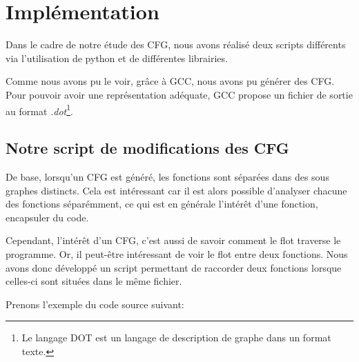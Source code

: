 \section{Implémentation}
Dans le cadre de notre étude des CFG, nous avons réalisé deux scripts différents via l'utilisation de python et de différentes librairies.

Comme nous avons pu le voir, grâce à GCC, nous avons pu générer des CFG. Pour pouvoir avoir une représentation adéquate, GCC propose un fichier de sortie au format \textit{.dot}\footnote{Le langage DOT est un langage de description de graphe dans un format texte.}.

\subsection{Notre script de modifications des CFG}
De base, lorsqu'un CFG est généré, les fonctions sont séparées dans des sous graphes distincts. Cela est intéressant car il est alors possible d'analyser chacune des fonctions séparémment, ce qui est en générale l'intérêt d'une fonction, encapsuler du code.

Cependant, l'intérêt d'un CFG, c'est aussi de savoir comment le flot traverse le programme. Or, il peut-être intéressant de voir le flot entre deux fonctions. Nous avons donc développé un script permettant de raccorder deux fonctions lorsque celles-ci sont situées dans le même fichier.

Prenons l'exemple du code source suivant:


